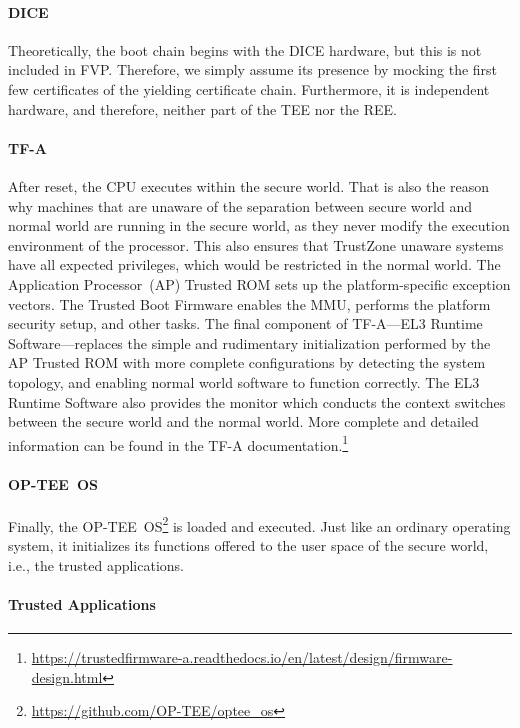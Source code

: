 \paragraph{DICE}
Theoretically, the boot chain begins with the DICE hardware, but this is not included in FVP\@.
Therefore, we simply assume its presence by mocking the first few certificates of the yielding certificate chain.
Furthermore, it is independent hardware, and therefore, neither part of the TEE nor the REE\@.

\paragraph{TF-A}
After reset, the CPU executes within the secure world.
That is also the reason why machines that are unaware of the separation between secure world and normal world are running in the secure world, as they never modify the execution environment of the processor.
This also ensures that TrustZone unaware systems have all expected privileges, which would be restricted in the normal world.
The Application Processor~(AP) Trusted ROM sets up the platform-specific exception vectors.
The Trusted Boot Firmware enables the MMU, performs the platform security setup, and other tasks.
The final component of TF-A---EL3 Runtime Software---replaces the simple and rudimentary initialization performed by the AP Trusted ROM with more complete configurations by detecting the system topology, and enabling normal world software to function correctly.
The EL3 Runtime Software also provides the monitor which conducts the context switches between the secure world and the normal world.
More complete and detailed information can be found in the TF-A documentation.\footnote{\url{https://trustedfirmware-a.readthedocs.io/en/latest/design/firmware-design.html}}

\paragraph{OP-TEE~OS}
Finally, the OP-TEE~OS\footnote{\url{https://github.com/OP-TEE/optee_os}} is loaded and executed.
Just like an ordinary operating system, it initializes its functions offered to the user space of the secure world, i.e., the trusted applications.

\paragraph{Trusted Applications}

